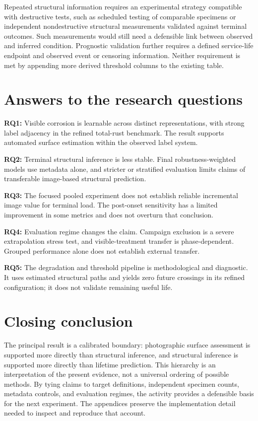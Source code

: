 Repeated structural information requires an experimental strategy compatible with destructive tests, such as scheduled testing of comparable specimens or independent nondestructive structural measurements validated against terminal outcomes. Such measurements would still need a defensible link between observed and inferred condition. Prognostic validation further requires a defined service-life endpoint and observed event or censoring information. Neither requirement is met by appending more derived threshold columns to the existing table.

\section{Answers to the research questions}
\textbf{RQ1:} Visible corrosion is learnable across distinct representations, with strong label adjacency in the refined total-rust benchmark. The result supports automated surface estimation within the observed label system.

\textbf{RQ2:} Terminal structural inference is less stable. Final robustness-weighted models use metadata alone, and stricter or stratified evaluation limits claims of transferable image-based structural prediction.

\textbf{RQ3:} The focused pooled experiment does not establish reliable incremental image value for terminal load. The post-onset sensitivity has a limited improvement in some metrics and does not overturn that conclusion.

\textbf{RQ4:} Evaluation regime changes the claim. Campaign exclusion is a severe extrapolation stress test, and visible-treatment transfer is phase-dependent. Grouped performance alone does not establish external transfer.

\textbf{RQ5:} The degradation and threshold pipeline is methodological and diagnostic. It uses estimated structural paths and yields zero future crossings in its refined configuration; it does not validate remaining useful life.

\section{Closing conclusion}
The principal result is a calibrated boundary: photographic surface assessment is supported more directly than structural inference, and structural inference is supported more directly than lifetime prediction. This hierarchy is an interpretation of the present evidence, not a universal ordering of possible methods. By tying claims to target definitions, independent specimen counts, metadata controls, and evaluation regimes, the activity provides a defensible basis for the next experiment. The appendices preserve the implementation detail needed to inspect and reproduce that account.

